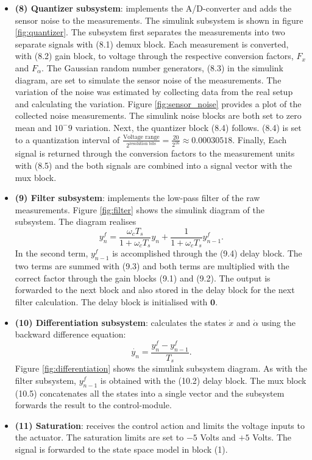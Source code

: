 \documentclass[a4paper,10pt]{article}
\theoremstyle{bluehomework}
\numberwithin{equation}{section}
\begin{document}
\begin{itemize}
  \item \textbf{(8) Quantizer subsystem}: implements the A/D-converter and adds the sensor noise to the measurements. The simulink subsystem is shown in figure \ref{fig:quantizer}. The subsystem first separates the measurements into two separate signals with (8.1) demux block. Each measurement is converted, with (8.2) gain block, to voltage through the respective conversion factors, $F_x$ and $F_\alpha$. The Gaussian random number generators, (8.3) in the simulink diagram, are set to simulate the sensor noise of the measurements. The variation of the noise was estimated by collecting data from the real setup and calculating the variation. Figure \ref{fig:sensor_noise} provides a plot of the collected noise measurements. The simulink noise blocks are both set to zero mean and $10^-9$ variation. Next, the quantizer block (8.4) follows. (8.4) is set to a quantization interval of $\frac{\text{Voltage range}}{2^{\text{resolution bits}}} = \frac{20}{2^{16}} \approx 0.00030518$. Finally, Each signal is returned through the conversion factors to the measurement units with (8.5) and the both signals are combined into a signal vector with the mux block.  
  \item \textbf{(9) Filter subsystem}: implements the low-pass filter of the raw measurements. Figure \ref{fig:filter} shows the simulink diagram of the subsystem. The diagram realises 
  \[ y_n^f = \frac{\omega_c T_s}{1+\omega_cT_s}y_n + \frac{1}{1+\omega_cT_s}y_{n-1}^f.\]
  In the second term, $y_{n-1}^f$ is accomplished through the (9.4) delay block. The two terms are summed with (9.3) and both terms are multiplied with the correct factor through the gain blocks (9.1) and (9.2). The output is forwarded to the next block and also stored in the delay block for the next filter calculation. The delay block is initialised with $\mathbf{0}$.
  \item \textbf{(10) Differentiation subsystem}: calculates the states $\dot{x}$ and $\dot{\alpha}$ using the backward difference equation:
  \[ \dot{y_n} = \frac{y^f_n - y^f_{n-1}}{T_s}.\]
  Figure \ref{fig:differentiation} shows the simulink subsystem diagram. As with the filter subsystem, $y^f_{n-1}$ is obtained with the (10.2) delay block. The mux block (10.5) concatenates all the states into a single vector and the subsystem forwards the result to the control-module. 
  \item \textbf{(11) Saturation}: receives the control action and limits the voltage inputs to the actuator. The saturation limits are set to $-5$ Volts and $+5$ Volts. The signal is forwarded to the state space model in block (1).
\end{itemize}
\end{document}
